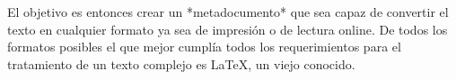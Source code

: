       
El objetivo es entonces crear un *metadocumento* que sea capaz de
convertir el texto en cualquier formato ya sea de impresión o de
lectura online. De todos los formatos posibles el que mejor cumplía todos los requerimientos para el tratamiento de un texto complejo es \LaTeX , un viejo conocido.

